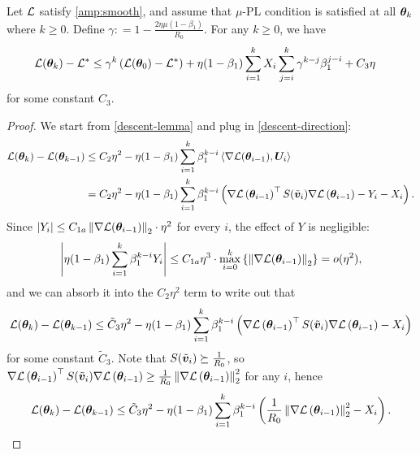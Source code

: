 \begin{lemma}\label{descent-lemma-exp}
    Let $\mathcal{L}$ satisfy \cref{amp:smooth}, and assume that $\mu$-PL condition is satisfied at all ${\bm{\theta}}_k$ where $k \geq 0$. Define $\gamma: = 1 - \frac{2\eta\mu (1-\beta_1)}{R_0}$.
    For any $k \geq 0$, we have
    \begin{align*}
        \mathcal{L}({\bm{\theta}}_{k})-\mathcal{L}^* & \leq \gamma^k \left(\mathcal{L}({\bm{\theta}}_0) - \mathcal{L}^*\right) + \eta (1-\beta_1)\sum_{i=1}^{k}X_i  \sum_{j=i}^{k}\gamma^{k-j}\beta_1^{j-i} + C_{3} \eta
    \end{align*}
    for some constant $C_3$.
\end{lemma}
\begin{proof}
    We start from \cref{descent-lemma} and plug in \cref{descent-direction}:\begin{align*}
    \mathcal{L}({\bm{\theta}}_{k}) - \mathcal{L}({\bm{\theta}}_{k-1}) &\leq C_2 \eta^2 -\eta (1-\beta_1)\sum_{i=1}^{k} \beta_1^{k-i}\left\langle \nabla\mathcal{L}({\bm{\theta}}_{i-1}), {\bm{U}}_i \right\rangle \\
    & = C_2 \eta^2 - \eta (1-\beta_1) \sum_{i=1}^{k} \beta_1^{k-i} \left(\nabla\mathcal{L}\left({\bm{\theta}}_{i-1}\right)^\top S(\tilde{{\bm{v}}}_i) \nabla\mathcal{L}\left({\bm{\theta}}_{i-1}\right) - Y_i - X_i\right).
    \end{align*}
    Since $\left|Y_i\right| \leq C_{1a}\left\|\nabla\mathcal{L}({\bm{\theta}}_{i-1})\right\|_2\cdot \eta^2$ for every $i$, the effect of $Y$ is negligible: \begin{align*}
        \left|\eta(1-\beta_1)\sum_{i=1}^{k}\beta_1^{k-i}Y_i\right| \leq C_{1a} \eta^3\cdot \max_{i=0}^{k}\left\{\left\|\nabla\mathcal{L}({\bm{\theta}}_{i-1})\right\|_2\right\} = o(\eta^2),
    \end{align*}
    and we can absorb it into the $C_2 \eta^2$ term to write out that 
    \begin{align*}
    \mathcal{L}({\bm{\theta}}_{k}) - \mathcal{L}({\bm{\theta}}_{k-1}) \leq \tilde{C}_3 \eta^2 - \eta (1-\beta_1) \sum_{i=1}^{k} \beta_1^{k-i} \left(\nabla\mathcal{L}\left({\bm{\theta}}_{i-1}\right)^\top S(\tilde{{\bm{v}}}_i) \nabla\mathcal{L}\left({\bm{\theta}}_{i-1}\right) - X_i\right)
    \end{align*}
    for some constant $\tilde{C}_3$.
    Note that $S(\tilde{{\bm{v}}}_i) \succeq \frac{1}{R_0}$, so $\nabla\mathcal{L}\left({\bm{\theta}}_{i-1}\right)^\top S(\tilde{{\bm{v}}}_i) \nabla\mathcal{L}\left({\bm{\theta}}_{i-1}\right) \geq \frac{1}{R_0}\left\|\nabla\mathcal{L}\left({\bm{\theta}}_{i-1}\right)\right\|_2^2$ for any $i$, hence\begin{align}\label{equ:loss-decrease}
        \cL(\vtheta_{k}) - \cL(\vtheta_{k-1}) \leq \tilde{C}_3 \eta^2 - \eta (1-\beta_1) \sum_{i=1}^{k} \beta_1^{k-i} \left(\frac{1}{R_0}\lnormtwo{\nabla\cL\left(\vtheta_{i-1}\right)}^2 - X_i\right).

\end{align}
\end{proof}
